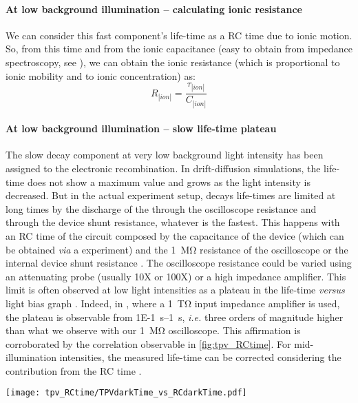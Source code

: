 		\paragraph{At low background illumination -- calculating ionic resistance}
		We can consider this fast component's life-time as a RC time due to ionic motion.
		So, from this time and from the ionic capacitance (easy to obtain from impedance spectroscopy, see ), we can obtain the ionic resistance (which is proportional to ionic mobility and to ionic concentration) as:
		\begin{equation}
			R_|ion| = \frac{\tau_|ion|}{C_|ion|}
		\end{equation}

		\paragraph{At low background illumination -- slow life\hyp{}time plateau}
		The slow decay component at very low background light intensity has been assigned to the electronic recombination.
		In drift-diffusion simulations, the life\hyp{}time does not show a maximum value and grows as the light intensity is decreased.
		But in the actual experiment setup, decays life\hyp{}times are limited at long times by the discharge of the through the oscilloscope resistance and through the device shunt resistance, whatever is the fastest.
		This happens with an RC time of the circuit composed by the capacitance of the device (which can be obtained \textsl{via} a  experiment) and the \SI{1}{\Mohm} resistance of the oscilloscope or the internal device shunt resistance \cite{Tvingstedt2017}.
		The oscilloscope resistance could be varied using an attenuating probe (usually 10X or 100X) or a high impedance amplifier.
		This limit is often observed at low light intensities as a plateau in the  life\hyp{}time \textsl{versus} light bias graph \cite{Tvingstedt2017}.
		Indeed, in , where a \SI{1}{\tera\ohm} input impedance amplifier is used, the plateau is observable from \SIrange{1E-1}{1}{\s}, \textsl{i.e.} three orders of magnitude higher than what we observe with our \SI{1}{\Mohm} oscilloscope.
		This affirmation is corroborated by the correlation observable in \cref{fig:tpv_RCtime}.
		For mid-illumination intensities, the measured life\hyp{}time can be corrected considering the contribution from the RC time \cite{Credgington2014}.

		\begin{SCfigure}
			\centering
			\texttt{[image: tpv\_RCtime/TPVdarkTime\_vs\_RCdarkTime.pdf]}
			\label{fig:tpv_RCtime}
		\end{SCfigure}

